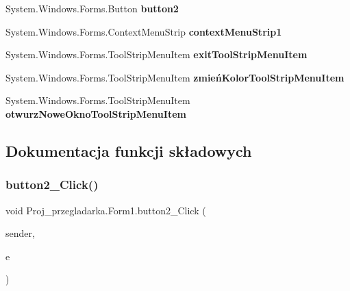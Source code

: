 \begin{DoxyCompactItemize}
System.\+Windows.\+Forms.\+Button {\bfseries button2}
\item 
\mbox{\label{class_proj__przegladarka_1_1_form1_ab83b1df554d7d87827961a35f753cf48}} 
System.\+Windows.\+Forms.\+Context\+Menu\+Strip {\bfseries context\+Menu\+Strip1}
\item 
\mbox{\label{class_proj__przegladarka_1_1_form1_a6e977ead759471b5dec18b9d3d4e14e7}} 
System.\+Windows.\+Forms.\+Tool\+Strip\+Menu\+Item {\bfseries exit\+Tool\+Strip\+Menu\+Item}
\item 
\mbox{\label{class_proj__przegladarka_1_1_form1_ae4fe938936aef8b48dc28cb157aea704}} 
System.\+Windows.\+Forms.\+Tool\+Strip\+Menu\+Item {\bfseries zmień\+Kolor\+Tool\+Strip\+Menu\+Item}
\item 
\mbox{\label{class_proj__przegladarka_1_1_form1_ae812dd00f73bedc32b0a6e457ee4086e}} 
System.\+Windows.\+Forms.\+Tool\+Strip\+Menu\+Item {\bfseries otwurz\+Nowe\+Okno\+Tool\+Strip\+Menu\+Item}
\end{DoxyCompactItemize}


\subsection{Dokumentacja funkcji składowych}
\mbox{\label{class_proj__przegladarka_1_1_form1_aacf6a593abf9b098a8c5e5fcce42d938}} 
\subsubsection{\texorpdfstring{button2\_Click()}{button2\_Click()}}
{\footnotesize\ttfamily void Proj\+\_\+przegladarka.\+Form1.\+button2\+\_\+\+Click (\begin{DoxyParamCaption}\item[{object}]{sender,  }\item[{Event\+Args}]{e }\end{DoxyParamCaption})\hspace{0.3cm}{\ttfamily [private]}}



